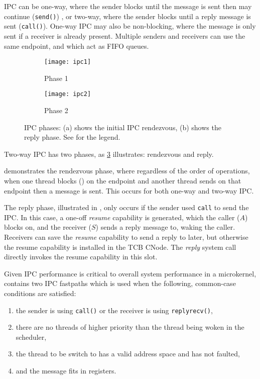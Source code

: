 IPC can be one-way, where the sender blocks until the message is sent then may continue
(\texttt{send()}) , or two-way,
where the sender blocks until a reply message is sent (\texttt{call()}). One-way IPC may also be
non-blocking, where the message is only sent if a receiver is already present.
Multiple senders and receivers can use the same endpoint, and which act as \gls{FIFO}
queues. 

\begin{figure}
    \centering
    \begin{subfigure}[h]{0.48\textwidth}
        \centering
        \texttt{[image: ipc1]}
        \caption{Phase 1}
        \label{f:ipc1}
    \end{subfigure}%
    \begin{subfigure}[h]{0.48\textwidth}
        \centering
        \texttt{[image: ipc2]}
        \caption{Phase 2}
        \label{f:ipc2}
    \end{subfigure}
    \caption{IPC phases: (a) shows the initial IPC rendezvous, (b) shows the
    reply phase. See  for the legend.}
    \label{f:ipc}
\end{figure}

Two-way IPC has two phases, as \cref{f:ipc} illustrates: rendezvous and reply.

 demonstrates the rendezvous phase, where regardless of the order of operations, 
when one thread blocks () on the endpoint and another thread sends on that endpoint
then a message is sent. This occurs for both one-way and two-way \gls{IPC}.

The reply phase, illustrated in , only occurs if the sender used \texttt{call} to send
the \gls{IPC}. In this case, a one-off \emph{resume} capability is generated, which the caller ($A$)
blocks on, and the receiver ($S$) sends a reply message to, waking the caller. Receivers can save
the \emph{resume} capability to send a reply to later, but otherwise the resume capability is
installed in the \gls{TCB} CNode. The \emph{reply} system call directly invokes the resume
capability in this slot. 

Given \gls{IPC} performance is critical to overall system performance in a microkernel, \selfour
contains two \gls{IPC} fastpaths which is used when the following, common-case conditions are satisfied:

\begin{enumerate}
    \item the sender is using \texttt{call()} or the receiver is using \texttt{replyrecv()},
    \item there are no threads of higher priority than the thread being woken in the scheduler,
    \item the thread to be switch to has a valid address space and has not faulted,
    \item and the message fits in registers.
\end{enumerate}

